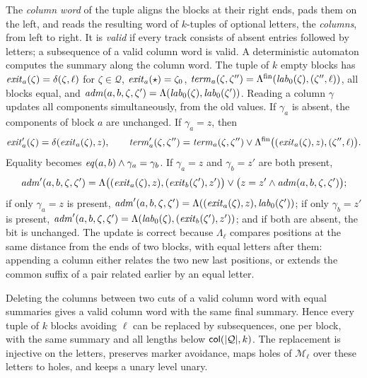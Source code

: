 The \emph{column word} of the tuple aligns the blocks at their right ends, pads
them on the left, and reads the resulting word of $k$-tuples of optional
letters, the \emph{columns}, from left to right. It is \emph{valid} if every
track consists of absent entries followed by letters; a subsequence of a valid
column word is valid. A deterministic automaton computes the summary along the
column word. The tuple of $k$ empty blocks has
$\mathit{exit}_a(\zeta)=\delta(\zeta,\ell)$ for $\zeta\in\mathcal Q$,
$\mathit{exit}_a(\star)=\zeta_0$, $\mathit{term}_a(\zeta,\zeta'')=
\Lambda^{\mathrm{fin}}(\mathit{lab}_0(\zeta),(\zeta'',\ell))$, all blocks equal, and
$\mathit{adm}(a,b,\zeta,\zeta')=\Lambda(\mathit{lab}_0(\zeta),\mathit{lab}_0(\zeta'))$. Reading a column
$\gamma$ updates all components simultaneously, from the old values. If
$\gamma_a$ is absent, the components of block $a$ are unchanged. If
$\gamma_a=z$, then
\[
 \mathit{exit}'_a(\zeta)=\delta(\mathit{exit}_a(\zeta),z),\qquad
 \mathit{term}'_a(\zeta,\zeta'')=\mathit{term}_a(\zeta,\zeta'')\lor
   \Lambda^{\mathrm{fin}}\bigl((\mathit{exit}_a(\zeta),z),(\zeta'',\ell)\bigr).
\]
Equality becomes $\mathit{eq}(a,b)\land\gamma_a=\gamma_b$. If $\gamma_a=z$ and
$\gamma_b=z'$ are both present,
\[
 \mathit{adm}'(a,b,\zeta,\zeta')=
 \Lambda\bigl((\mathit{exit}_a(\zeta),z),(\mathit{exit}_b(\zeta'),z')\bigr)
 \lor\bigl(z=z'\land\mathit{adm}(a,b,\zeta,\zeta')\bigr);
\]
if only $\gamma_a=z$ is present,
$\mathit{adm}'(a,b,\zeta,\zeta')=\Lambda((\mathit{exit}_a(\zeta),z),\mathit{lab}_0(\zeta'))$; if only
$\gamma_b=z'$ is present,
$\mathit{adm}'(a,b,\zeta,\zeta')=\Lambda(\mathit{lab}_0(\zeta),(\mathit{exit}_b(\zeta'),z'))$; and if
both are absent, the bit is unchanged. The update is correct because
$\Lambda_\ell$ compares positions at the same distance from the ends of two
blocks, with equal letters after them: appending a column either relates the
two new last positions, or extends the common suffix of a pair related earlier
by an equal letter.

\begin{lemma}\label{lem:bg-columns}
Deleting the columns between two cuts of a valid column word with equal
summaries gives a valid column word with the same final summary. Hence every
tuple of $k$ blocks avoiding $\ell$ can be replaced by subsequences, one per
block, with the same summary and all lengths below
$\mathsf{col}(\lvert \mathcal Q\rvert,k)$. The replacement is injective on the
letters, preserves marker avoidance, maps holes of $\mathcal M_\ell$ over these
letters to holes, and keeps a unary level unary.
\end{lemma}

